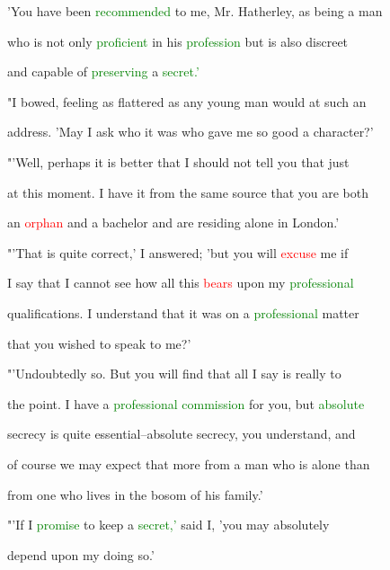  'You have been \textcolor{green}{recommended} to me, Mr. Hatherley, as being a man

 who is not only \textcolor{green}{proficient} in his \textcolor{green}{profession} but is also \textcolor{BurntOrange}{discreet}

 and capable of \textcolor{green}{preserving} a \textcolor{green}{secret.'}



 "I bowed, feeling as flattered as any \textcolor{BurntOrange}{young} man would at such an

 address. 'May I ask who it was who gave me so \textcolor{BurntOrange}{good} a character?'



 "'Well, perhaps it is better that I should not tell you that just

 at this moment. I have it from the same source that you are both

 an \textcolor{red}{orphan} and a bachelor and are residing alone in London.'



 "'That is quite correct,' I answered; 'but you will \textcolor{red}{excuse} me if

 I say that I cannot see how all this \textcolor{red}{bears} upon my \textcolor{green}{professional}

 qualifications. I understand that it was on a \textcolor{green}{professional} matter

 that you wished to speak to me?'



 "'Undoubtedly so. But you will find that all I say is really to

 the point. I have a \textcolor{green}{professional} \textcolor{green}{commission} for you, but \textcolor{green}{absolute}

 \textcolor{BurntOrange}{secrecy} is quite essential--absolute \textcolor{BurntOrange}{secrecy,} you understand, and

 of course we may \textcolor{BurntOrange}{expect} that more from a man who is alone than

 from one who lives in the bosom of his family.'



 "'If I \textcolor{green}{promise} to keep a \textcolor{green}{secret,'} said I, 'you may absolutely

 \textcolor{BurntOrange}{depend} upon my doing so.'



